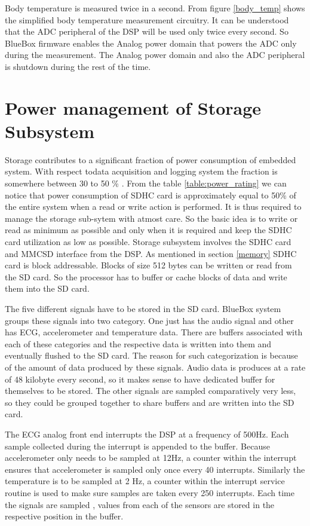Body temperature is measured twice in a second. From figure \ref{body_temp} shows the simplified body temperature measurement circuitry. It can be understood that the ADC peripheral of the DSP will be used only twice every second. So BlueBox firmware enables the Analog power domain that powers the ADC only during the measurement. The Analog power domain and also the ADC peripheral is shutdown during the rest of the time. 

\section{Power management of Storage Subsystem}
Storage contributes to a significant fraction of power consumption of embedded system. With respect todata acquisition and logging system the fraction is somewhere between 30 to 50 \% . From the table \ref{table:power_rating} we can notice that power consumption of SDHC card is approximately equal to 50\% of the entire system when a read or write action is performed. It is thus required to manage the storage sub-sytem with atmost care. So the basic idea is to write or read as minimum as possible and only when it is required and keep the SDHC card utilization as low as possible.
Storage subsystem involves the SDHC card and MMCSD interface from the DSP. As mentioned in section \ref{memory} SDHC card is block addressable. Blocks of size 512 bytes can be written or read from the SD card. So the processor has to buffer or cache blocks of data and write them into the SD card.  

The five different signals have to be stored in the SD card. BlueBox system groups these signals into two category. One just has the audio signal and other has ECG, accelerometer and temperature data. There are buffers associated with each of these categories and the respective data is written into them and eventually flushed to the SD card. The reason for such categorization is because of the amount of data produced by these signals. Audio data is produces at a rate of 48 kilobyte every second, so it makes sense to have dedicated buffer for themselves to be stored. The other signals are sampled comparatively very less, so they could be grouped together to share buffers and are written into the SD card. 

The ECG analog front end interrupts the DSP at a frequency of 500Hz. Each sample collected during the interrupt is appended to the buffer. Because accelerometer only needs to be sampled at 12Hz, a counter within the interrupt ensures that accelerometer is sampled only once every 40 interrupts. Similarly the temperature is to be sampled at 2 Hz, a counter within the interrupt service routine is used to make sure samples are taken every 250 interrupts. Each time the signals are sampled , values from each of the sensors are stored in the respective position in the buffer. 

